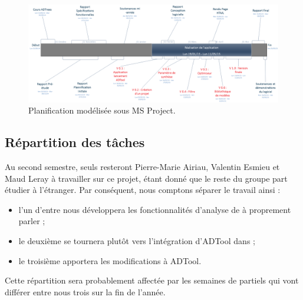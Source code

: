 		\begin{landscape}
			\begin{figure}
				\centering
				\includegraphics[height=0.60\textwidth]{figure/planification.png}
				\caption{Planification modélisée sous MS Project.}
				\label{fig:planif}
			\end{figure}
		\end{landscape}

	\subsection{Répartition des tâches}
		Au second semestre, seuls resteront Pierre-Marie {\sc Airiau}, Valentin {\sc Esmieu} et Maud {\sc Leray} à travailler sur ce projet, étant donné que le reste du groupe part étudier à l'étranger. Par conséquent, nous comptons séparer le travail ainsi :
		\begin{itemize} 
			\item l'un d'entre nous développera les fonctionnalités d'analyse de \glasir{} à proprement parler ;
			\item le deuxième se tournera plutôt vers l'intégration d'ADTool dans \glasir{} ;
			\item le troisième apportera les modifications à ADTool.
		\end{itemize} Cette répartition sera probablement affectée par les semaines de partiels qui vont différer entre nous trois sur la fin de l'année. 